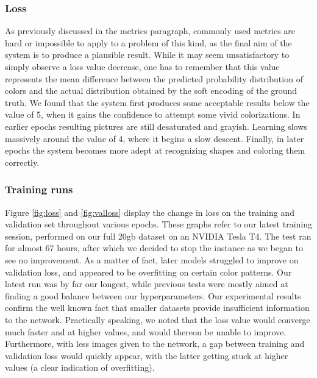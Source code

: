 \documentclass[twoside,twocolumn]{article}
\begin{document}
\subsubsection{Loss}

As previously discussed in the metrics paragraph, commonly used metrics are hard or impossible to apply to a problem of this kind, as the final aim of the system is to produce a plausible result. While it may seem unsatisfactory to simply observe a loss value decrease, one has to remember that this value represents the mean difference between the predicted probability distribution of colors and the actual distribution obtained by the soft encoding of the ground truth. 
We found that the system first produces some acceptable results below the value of 5, when it gains the confidence to attempt some vivid colorizations. In earlier epochs resulting pictures are still desaturated and grayish. Learning slows massively around the value of 4, where it begins a slow descent. Finally, in later epochs the system becomes more adept at recognizing shapes and coloring them correctly.

\subsubsection{Training runs}

Figure \ref{fig:loss} and \ref{fig:valloss} display the change in loss on the training and validation set throughout various epochs. These graphs refer to our latest training session, performed on our full 20gb dataset on an NVIDIA Tesla T4. The test ran for almost 67 hours, after which we decided to stop the instance as we began to see no improvement. As a matter of fact, later models struggled to improve on validation loss, and appeared to be overfitting on certain color patterns. 
Our latest run was by far our longest, while previous tests were mostly aimed at finding a good balance between our hyperparameters. Our experimental results confirm the well known fact that smaller datasets provide insufficient information to the network. Practically speaking, we noted that the loss value would converge much faster and at higher values, and would thereon be unable to improve. Furthermore, with less images given to the network, a gap between training and validation loss would quickly appear, with the latter getting stuck at higher values (a clear indication of overfitting).
\end{document}

